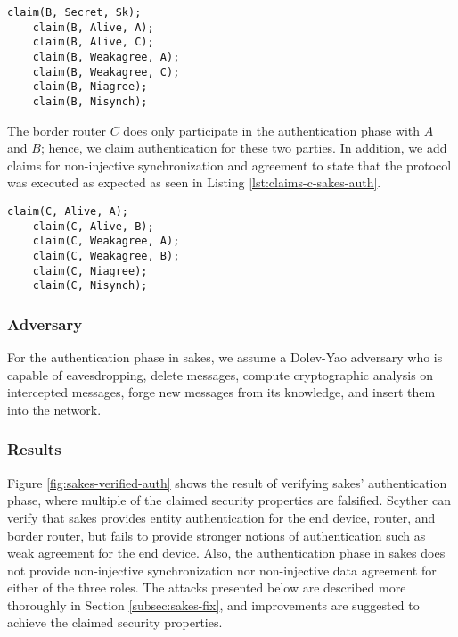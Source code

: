\newpage

\begin{lstlisting}[caption={Security claims for role B during the authentication phase in SAKES.}, label={lst:claims-b-sakes-auth}, style=code-listings]
	claim(B, Secret, Sk);
	claim(B, Alive, A);
	claim(B, Alive, C);
	claim(B, Weakagree, A);
	claim(B, Weakagree, C);
	claim(B, Niagree);
	claim(B, Nisynch);
\end{lstlisting}

The border router $C$ does only participate in the authentication phase with $A$ and $B$; hence, we claim authentication for these two parties. In addition, we add claims for non-injective synchronization and agreement to state that the protocol was executed as expected as seen in Listing \ref{lst:claims-c-sakes-auth}.\\

\begin{lstlisting}[caption={Security claims for role C during key establishment in SAKES.}, label={lst:claims-c-sakes-auth}, style=code-listings]
	claim(C, Alive, A);
	claim(C, Alive, B);
	claim(C, Weakagree, A);
	claim(C, Weakagree, B);
	claim(C, Niagree);
	claim(C, Nisynch);
\end{lstlisting}

\subsubsection{Adversary}

For the authentication phase in \gls{sakes}, we assume a Dolev-Yao adversary who is capable of eavesdropping, delete messages, compute cryptographic analysis on intercepted messages, forge new messages from its knowledge, and insert them into the network. 

\subsubsection{Results}

Figure \ref{fig:sakes-verified-auth} shows the result of verifying \gls{sakes}' authentication phase, where multiple of the claimed security properties are falsified. Scyther can verify that \gls{sakes} provides entity authentication for the end device, router, and border router, but fails to provide stronger notions of authentication such as weak agreement for the end device. Also, the authentication phase in \gls{sakes} does not provide non-injective synchronization nor non-injective data agreement for either of the three roles. The attacks presented below are described more thoroughly in Section \ref{subsec:sakes-fix}, and improvements are suggested to achieve the claimed security properties.


